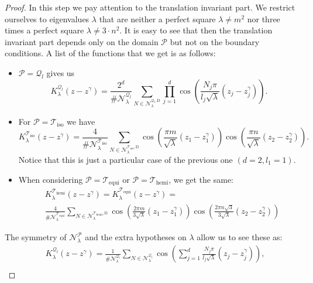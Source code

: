 \documentclass{amsart}
\theoremstyle{definition}
\theoremstyle{remark}
\numberwithin{equation}{section}
\theoremstyle{definition}
\theoremstyle{remark}
\begin{document}
\begin{proof}
	In this step we pay attention to the translation invariant part. We restrict ourselves to eigenvalues $\lambda$ that are neither a perfect square $\lambda\neq m^2$ nor three times a perfect square $\lambda\neq 3\cdot n^2$. It is easy to see that then the translation invariant part depends only on the domain $\mathcal{P}$ but not on the boundary conditions.  A list of the functions that we get is as follows:
	\begin{itemize}
		\item $\mathcal{P}=\mathcal{Q}_l$ gives us	\begin{equation}
			K_{\lambda}^{\mathcal{Q}_l}(z-z^\gamma)=\frac{2^d}{\#\mathcal{N}_\lambda^{\mathcal{Q}_l}}\sum_{N\in\mathcal{N}_\lambda^{\mathcal{Q}_l,\mathrm{D}}}\prod_{j=1}^{d}\cos\left(\frac{N_j\pi}{l_j\sqrt{\lambda}}(z_j-z^\gamma_j)\right).
		\end{equation}
		\item For $\mathcal{P}=\mathcal{T}_\mathrm{iso}$ we have
		\begin{equation}
			K_{\lambda}^{\mathcal{T}_\mathrm{iso}}(z-z^\gamma)=\frac{4}{\#\mathcal{N}_\lambda^{\mathcal{T}_\mathrm{iso}}}\sum_{N\in\mathcal{N}_\lambda^{\mathcal{T}_\mathrm{iso},\mathrm{D}}}\cos\left(\frac{\pi m}{\sqrt{\lambda}}(z_1-z^\gamma_1)\right)\cos\left(\frac{\pi n}{\sqrt{\lambda}}(z_2-z^\gamma_2)\right).
		\end{equation}Notice that this is just a particular case of the previous one $(d=2,l_1=1)$. 
		\item When considering $\mathcal{P}=	\mathcal{T}_\mathrm{equi}$ or $\mathcal{P}=\mathcal{T}_\mathrm{hemi}$, we get the same:
		\begin{equation}
			\begin{aligned}	&K_{\lambda}^{\mathcal{T}_\mathrm{hemi}}(z-z^\gamma)=K_{\lambda}^{	\mathcal{T}_\mathrm{equi}}(z-z^\gamma)=\\&\frac{4}{\#\mathcal{N}_\lambda^{\mathcal{T}_\mathrm{equi}}}\sum_{N\in\mathcal{N}_\lambda^{\mathcal{T}_\mathrm{hemi},\mathrm{D}}}\cos\left(\frac{2\pi m}{3\sqrt{\lambda}}(z_1-z^\gamma_1)\right)\cos\left(\frac{2\pi n\sqrt{3}}{3\sqrt{\lambda}}(z_2-z^\gamma_2)\right)
			\end{aligned}
		\end{equation}
	\end{itemize}
	The symmetry of $\mathcal{N}_\lambda^{\mathcal P}$ and the extra hypotheses on $\lambda$ allow us to see these as:
	\begin{equation}
		\begin{aligned}
			&K_{\lambda}^{\mathcal{Q}_l}(z-z^\gamma)=\frac{1}{\#\mathcal{N}_\lambda^{\mathcal{Q}_l}}\sum_{N\in\mathcal{N}_\lambda^{\mathcal{Q}_l}}\cos\left(\sum_{j=1}^d\frac{N_j\pi}{l_j\sqrt{\lambda}}(z_j-z^\gamma_j)\right),\\

\end{aligned}
\end{equation}
\end{proof}
\end{document}
